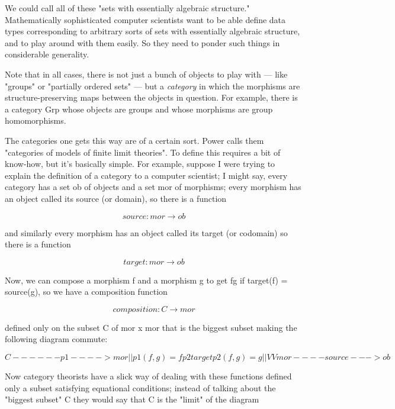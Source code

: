 We could call all of these "sets with essentially algebraic structure." 
Mathematically sophisticated computer scientists want to be able 
define data types corresponding to arbitrary sorts of sets with 
essentially algebraic structure, and to play around with them easily.  
So they need to ponder such things in considerable generality.

Note that in all cases, there is not just a bunch of objects to play with ---
like "groups" or "partially ordered sets" --- but a \emph{category} in which 
the morphisms are structure-preserving maps between the objects in question.  
For example, there is a category Grp whose objects are groups and whose 
morphisms are group homomorphisms.  

The categories one gets this way are of a certain sort.  Power calls 
them "categories of models of finite limit theories".  To define this 
requires a bit of know-how, but it's basically simple.  For example, suppose
I were trying to explain the definition of a category to a computer
scientist; I might say, every category has a set ob of objects
and a set mor of morphisms; every morphism has an object called
its source (or domain), so there is a function


$$

                  source: mor \to  ob
$$
    

and similarly every morphism has an object called its target
(or codomain) so there is a function


$$

                  target: mor \to  ob
$$
    

Now, we can compose a morphism f and a morphism g to get fg
if target(f) = source(g), so we have a composition function


$$

              composition: C \to  mor
$$
    

defined only on the subset C of mor x mor that is the biggest
subset making the following diagram commute:


$$

                   C  ------p1----> mor
                   |                 |             p1(f,g) = f
                  p2               target          p2(f,g) = g
                   |                 |
                   V                 V
                  mor ----source---> ob 
$$
    

Now category theorists have a slick way of dealing with these
functions defined only a subset satisfying equational conditions;
instead of talking about the "biggest subset" C they would say
that C is the "limit" of the diagram 


